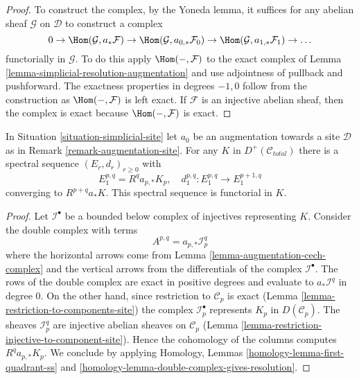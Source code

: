 \begin{proof}
To construct the complex, by the Yoneda lemma, it suffices for any
abelian sheaf $\mathcal{G}$ on $\mathcal{D}$ to construct a complex
$$
0 \to \Hom(\mathcal{G}, a_*\mathcal{F}) \to
\Hom(\mathcal{G}, a_{0, *}\mathcal{F}_0) \to
\Hom(\mathcal{G}, a_{1, *}\mathcal{F}_1) \to \ldots
$$
functorially in $\mathcal{G}$. To do this apply $\Hom(-, \mathcal{F})$
to the exact complex of Lemma \ref{lemma-simplicial-resolution-augmentation}
and use adjointness of pullback and pushforward.
The exactness properties in degrees $-1, 0$ follow from
the construction as $\Hom(-, \mathcal{F})$ is left exact.
If $\mathcal{F}$ is an injective abelian sheaf, then the
complex is exact because $\Hom(-, \mathcal{F})$ is exact.
\end{proof}

\begin{lemma}
\label{lemma-augmentation-spectral-sequence}
In Situation \ref{situation-simplicial-site} let
$a_0$ be an augmentation towards a site $\mathcal{D}$
as in Remark \ref{remark-augmentation-site}.
For any $K$ in $D^+(\mathcal{C}_{total})$ there is a spectral
sequence 
$(E_r, d_r)_{r \geq 0}$ with
$$
E_1^{p, q} = R^qa_{p, *} K_p,\quad
d_1^{p, q} : E_1^{p, q} \to E_1^{p + 1, q}
$$
converging to $R^{p + q}a_*K$. This spectral sequence is functorial in $K$.
\end{lemma}

\begin{proof}
Let $\mathcal{I}^\bullet$ be a bounded below complex of injectives
representing $K$. Consider the double complex with terms
$$
A^{p, q} = a_{p, *}\mathcal{I}^q_p
$$
where the horizontal arrows come from
Lemma \ref{lemma-augmentation-cech-complex}
and the vertical arrows from the differentials of the
complex $\mathcal{I}^\bullet$. The rows of the double complex are exact
in positive degrees and evaluate to $a_*\mathcal{I}^q$ in degree $0$.
On the other hand, since restriction to $\mathcal{C}_p$ is exact
(Lemma \ref{lemma-restriction-to-components-site})
the complex $\mathcal{I}_p^\bullet$ represents $K_p$ in
$D(\mathcal{C}_p)$. The sheaves $\mathcal{I}_p^q$ are injective
abelian sheaves on $\mathcal{C}_p$
(Lemma \ref{lemma-restriction-injective-to-component-site}).
Hence the cohomology of the columns computes $R^qa_{p, *}K_p$.
We conclude by applying
Homology, Lemmas \ref{homology-lemma-first-quadrant-ss} and
\ref{homology-lemma-double-complex-gives-resolution}.
\end{proof}





